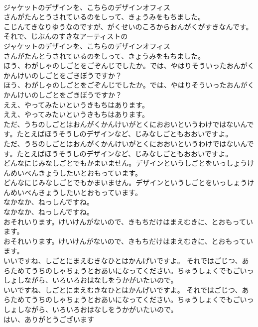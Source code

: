 \documentclass[8pt]{extreport}
\begin{document}
\begin{CJK}{UTF8}{min}
\\	ジャケットのデザインを、こちらのデザインオフィス
\\	さんがたんとうされているのをしって、きょうみをもちました。
\\	こじんてきなりゆうなのですが、がくせいのころからおんがくがすきなんです。それで、じぶんのすきなアーティストの
\\	ジャケットのデザインを、こちらのデザインオフィス
\\	さんがたんとうされているのをしって、きょうみをもちました。
\\	ほう、わがしゃのしごとをごぞんじでしたか。では、やはりそういったおんがくかんけいのしごとをごきぼうですか？
\\	ほう、わがしゃのしごとをごぞんじでしたか。では、やはりそういったおんがくかんけいのしごとをごきぼうですか？
\\	ええ、やってみたいというきもちはあります。
\\	ええ、やってみたいというきもちはあります。
\\	ただ、うちのしごとはおんがくかんけいがとくにおおいというわけではないんです。たとえばほうそうしのデザインなど、じみなしごともおおいですよ。
\\	ただ、うちのしごとはおんがくかんけいがとくにおおいというわけではないんです。たとえばほうそうしのデザインなど、じみなしごともおおいですよ。
\\	どんなにじみなしごとでもかまいません。デザインというしごとをいっしょうけんめいべんきょうしたいとおもっています。
\\	どんなにじみなしごとでもかまいません。デザインというしごとをいっしょうけんめいべんきょうしたいとおもっています。
\\	なかなか、ねっしんですね。
\\	なかなか、ねっしんですね。
\\	おそれいります。けいけんがないので、きもちだけはまえむきに、とおもっています。
\\	おそれいります。けいけんがないので、きもちだけはまえむきに、とおもっています。
\\	いいですね、しごとにまえむきなひとはかんげいですよ。 それではごじつ、あらためてうちのしゃちょうとおあいになってください。ちゅうしょくでもごいっしょしながら、いろいろおはなしをうかがいたいので。
\\	いいですね、しごとにまえむきなひとはかんげいですよ。 それではごじつ、あらためてうちのしゃちょうとおあいになってください。ちゅうしょくでもごいっしょしながら、いろいろおはなしをうかがいたいので。
\\	はい、ありがとうございます

\end{CJK}
\end{document}
